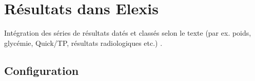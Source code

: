 
\section{Résultats dans Elexis}
\label{befunde}
Intégration des séries de résultats datés et classés selon le texte (par ex. poids, glycémie, Quick/TP, résultats radiologiques etc.) .
\subsection{Configuration}

